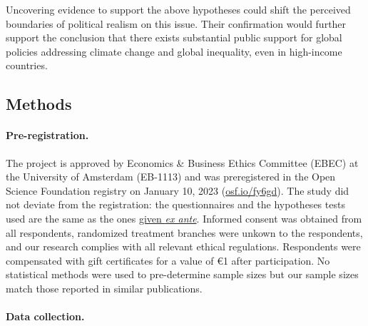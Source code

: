 \documentclass[12pt,english]{article}
\begin{document}
Uncovering evidence to support the above hypotheses could shift the perceived boundaries of political realism on this issue. Their confirmation would further support the conclusion that there exists substantial public support for global policies addressing climate change and global inequality, even in high-income countries.

  \begin{small} %
\section*{\normalsize Methods}\label{sec:methods} %

\paragraph{\small Pre-registration.}
The project is approved by Economics \& Business Ethics Committee (EBEC) at the University of Amsterdam (EB-1113) and %
was preregistered in the Open Science Foundation registry on January 10, 2023 (\href{https://osf.io/fy6gd}{osf.io/fy6gd}). The study did not deviate from the registration: the questionnaires and the hypotheses tests used are the same as the ones \href{https://osf.io/2b6vq}{given \textit{ex ante}}. Informed consent was obtained from all respondents, randomized treatment branches were unkown to the respondents, and our research complies with all relevant ethical regulations. Respondents were compensated with gift certificates for a value of \euro{}1 after participation. No statistical methods were used to pre-determine sample sizes but our sample sizes match those reported in similar publications.\citep{dechezlepretre_fighting_nodate,issp_international_2010,beiser-mcgrath_could_2019,sivonen_attitudes_2022,douenne_yellow_2022}

\paragraph{\small Data collection.} %


\end{small}
\end{document}
